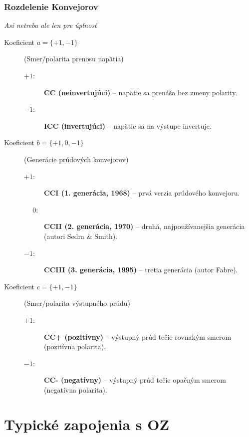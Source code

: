 \subsubsection{Rozdelenie Konvejorov}
\emph{Asi netreba ale len pre úplnosť}
\begin{description}
	\item[Koeficient $a = \{+1, -1\}$] (Smer/polarita prenosu napätia)
	\begin{description}
		\item[$+1$:] \textbf{CC (neinvertujúci)} -- napätie sa prenáša bez zmeny polarity.
		\item[$-1$:] \textbf{ICC (invertujúci)} -- napätie sa na výstupe invertuje.
	\end{description}
	
	\item[Koeficient $b = \{+1, 0, -1\}$] (Generácie prúdových konvejorov)
	\begin{description}
		\item[$+1$:] \textbf{CCI (1. generácia, 1968)} -- prvá verzia prúdového konvejoru.
		\item[$\phantom{+}0$:] \textbf{CCII (2. generácia, 1970)} -- druhá, najpoužívanejšia generácia (autori Sedra \& Smith).
		\item[$-1$:] \textbf{CCIII (3. generácia, 1995)} -- tretia generácia (autor Fabre).
	\end{description}
	
	\item[Koeficient $c = \{+1, -1\}$] (Smer/polarita výstupného prúdu)
	\begin{description}
		\item[$+1$:] \textbf{CC+ (pozitívny)} -- výstupný prúd tečie rovnakým smerom (pozitívna polarita).
		\item[$-1$:] \textbf{CC- (negatívny)} -- výstupný prúd tečie opačným smerom (negatívna polarita).
	\end{description}
\end{description}

\section{Typické zapojenia s OZ}
